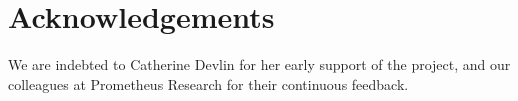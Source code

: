 
\section{Acknowledgements}

We are indebted to Catherine Devlin for her early support of the project, and
our colleagues at Prometheus Research for their continuous feedback.

